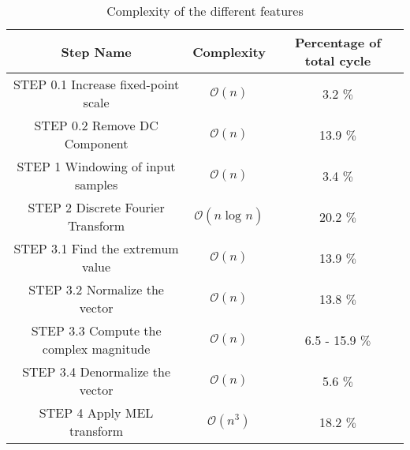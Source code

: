 \documentclass{article}
\begin{document}
\begin{table}[H]
    \centering
    \begin{tabular}{|c|c|c|}
         \hline
         Step Name & Complexity & Percentage of total cycle \\
         \hline
         \hline
         STEP 0.1 Increase fixed-point scale & $\mathcal{O}(n)$ & 3.2 $\%$ \\
         \hline
         STEP 0.2 Remove DC Component & $\mathcal{O}(n)$ & 13.9 $\%$ \\
         \hline
         STEP 1 Windowing of input samples & $\mathcal{O}(n)$ & 3.4 $\%$ \\
         \hline
         STEP 2 Discrete Fourier Transform & $\mathcal{O}(n\log_{}n)$ & 20.2 $\%$ \\
         \hline
         STEP 3.1 Find the extremum value & $\mathcal{O}(n)$ & 13.9 $\%$ \\
         \hline 
         STEP 3.2 Normalize the vector & $\mathcal{O}(n)$ & 13.8 $\%$ \\
         \hline
         STEP 3.3 Compute the complex magnitude & $\mathcal{O}(n)$ & 6.5 - 15.9 $\%$ \\
         \hline
         STEP 3.4 Denormalize the vector & $\mathcal{O}(n)$ & 5.6 $\%$ \\
         \hline 
         STEP 4 Apply MEL transform & $\mathcal{O}(n^3)$ & 18.2 $\%$ \\
         \hline
    \end{tabular}
    \caption{Complexity of the different features}
    \label{complexity}
\end{table}
\end{document}
